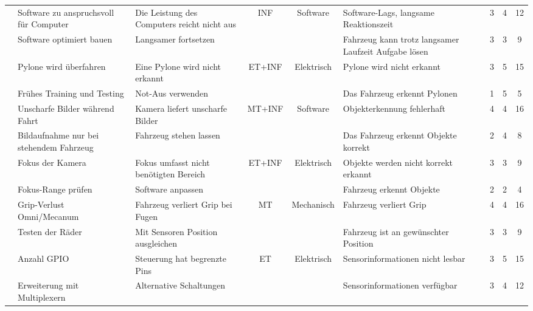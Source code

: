 \documentclass[../main.tex]{subfiles}
\begin{document}
\begin{landscape}
\begin{longtable}{|c|p{4.5cm}|p{5cm}|c|c|p{4.5cm}|c|c|c|}
\pagebreak

\rowcolor[HTML]{F5F5F5} & Software zu anspruchsvoll für Computer & Die Leistung des Computers reicht nicht aus & INF & Software & Software-Lags, langsame Reaktionszeit & 3 & 4 & 12 \\* \cline{2-3} \cline{6-9}
\rowcolor[HTML]{F5F5F5} \multirow{-2}{*}{R9} & Software optimiert bauen & Langsamer fortsetzen & & & Fahrzeug kann trotz langsamer Laufzeit Aufgabe lösen & 3 & 3 & 9 \\ \hline
\rowcolor{white} & Pylone wird überfahren & Eine Pylone wird nicht erkannt & ET+INF & Elektrisch & Pylone wird nicht erkannt & 3 & 5 & 15 \\* \cline{2-3} \cline{6-9}
\rowcolor{white} \multirow{-2}{*}{R10} & Frühes Training und Testing & Not-Aus verwenden & & & Das Fahrzeug erkennt Pylonen & 1 & 5 & 5 \\ \hline

\rowcolor[HTML]{F5F5F5} & Unscharfe Bilder während Fahrt & Kamera liefert unscharfe Bilder & MT+INF & Software & Objekterkennung fehlerhaft & 4 & 4 & 16 \\* \cline{2-3} \cline{6-9}
\rowcolor[HTML]{F5F5F5} \multirow{-2}{*}{R11} & Bildaufnahme nur bei stehendem Fahrzeug & Fahrzeug stehen lassen & & & Das Fahrzeug erkennt Objekte korrekt & 2 & 4 & 8 \\ \hline

\rowcolor{white} & Fokus der Kamera & Fokus umfasst nicht benötigten Bereich & ET+INF & Elektrisch & Objekte werden nicht korrekt erkannt & 3 & 3 & 9 \\* \cline{2-3} \cline{6-9}
\rowcolor{white} \multirow{-2}{*}{R12} & Fokus-Range prüfen & Software anpassen & & & Fahrzeug erkennt Objekte & 2 & 2 & 4 \\ \hline

\rowcolor[HTML]{F5F5F5} & Grip-Verlust Omni/Mecanum & Fahrzeug verliert Grip bei Fugen & MT & Mechanisch & Fahrzeug verliert Grip & 4 & 4 & 16 \\* \cline{2-3} \cline{6-9}
\rowcolor[HTML]{F5F5F5} \multirow{-2}{*}{R13} & Testen der Räder & Mit Sensoren Position ausgleichen & & & Fahrzeug ist an gewünschter Position & 3 & 3 & 9 \\ \hline

\rowcolor{white} & Anzahl GPIO & Steuerung hat begrenzte Pins & ET & Elektrisch & Sensorinformationen nicht lesbar & 3 & 5 & 15 \\* \cline{2-3} \cline{6-9}
\rowcolor{white} \multirow{-2}{*}{R14} & Erweiterung mit Multiplexern & Alternative Schaltungen & & & Sensorinformationen verfügbar & 3 & 4 & 12 \\ \hline


\end{longtable}
\end{landscape}
\end{document}
